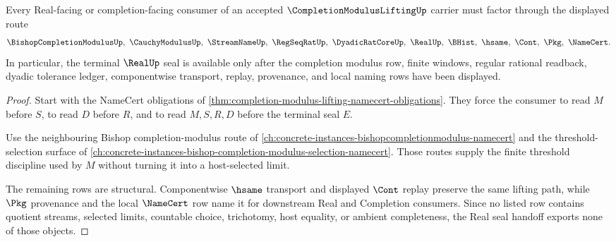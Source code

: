 \begin{theorem}
\label{thm:completion-modulus-lifting-real-seal-handoff}
Every Real-facing or completion-facing consumer of an accepted $\CompletionModulusLiftingUp$ carrier must factor through the displayed route
$$
\BishopCompletionModulusUp,\ \CauchyModulusUp,\ \StreamNameUp,\ \RegSeqRatUp,\ \DyadicRatCoreUp,\ \RealUp,\ \BHist,\ \hsame,\ \Cont,\ \Pkg,\ \NameCert .
$$
In particular, the terminal $\RealUp$ seal is available only after the completion modulus row, finite windows, regular rational readback, dyadic tolerance ledger, componentwise transport, replay, provenance, and local naming rows have been displayed.
\end{theorem}
\begin{proof}
Start with the NameCert obligations of \autoref{thm:completion-modulus-lifting-namecert-obligations}. They force the consumer to read $M$ before $S$, to read $D$ before $R$, and to read $M,S,R,D$ before the terminal seal $E$.

Use the neighbouring Bishop completion-modulus route of \autoref{ch:concrete-instances-bishopcompletionmodulus-namecert} and the threshold-selection surface of \autoref{ch:concrete-instances-bishop-completion-modulus-selection-namecert}. Those routes supply the finite threshold discipline used by $M$ without turning it into a host-selected limit.

The remaining rows are structural. Componentwise $\hsame$ transport and displayed $\Cont$ replay preserve the same lifting path, while $\Pkg$ provenance and the local $\NameCert$ row name it for downstream Real and Completion consumers. Since no listed row contains quotient streams, selected limits, countable choice, trichotomy, host equality, or ambient completeness, the Real seal handoff exports none of those objects.
\end{proof}



